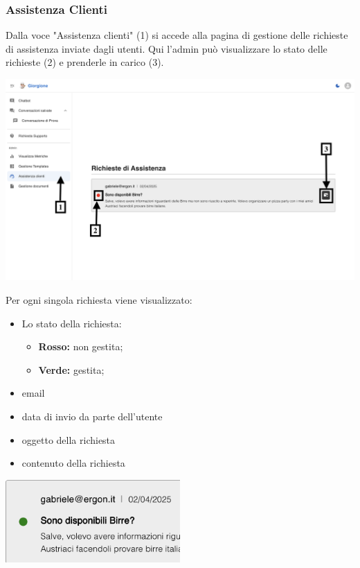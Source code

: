 \subsubsection{Assistenza Clienti}
Dalla voce "Assistenza clienti" (1) si accede alla pagina di gestione delle richieste di assistenza inviate dagli utenti. Qui l'admin può visualizzare lo stato delle richieste (2) e prenderle in carico (3).
\begin{center}
    \includegraphics[width=\textwidth]{./img/Assistenza1.png}
    \label{fig:Assistenza1}
\end{center}

Per ogni singola richiesta viene visualizzato:
\begin{itemize}
    \item Lo stato della richiesta:
    \begin{itemize}
        \item \textbf{Rosso:} non gestita;
        \item \textbf{Verde:} gestita;
    \end{itemize}
    \item email
    \item data di invio da parte dell'utente
    \item oggetto della richiesta
    \item contenuto della richiesta
\end{itemize}
\begin{center}
    \includegraphics[width=0.5\textwidth]{./img/Assistenza2.png}
\end{center}


